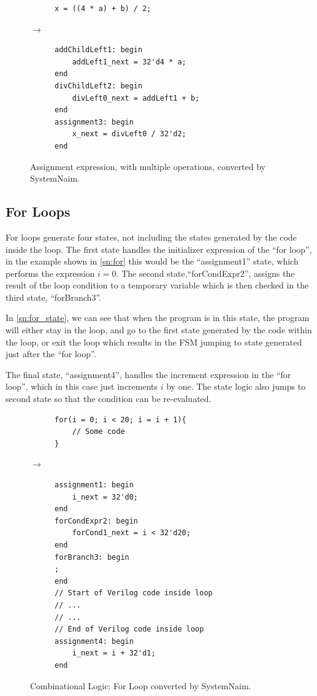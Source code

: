 \begin{figure}[H]
\centering
\begin{subfigure}{0.35\textwidth}
    \centering
    \begin{verbatim}
x = ((4 * a) + b) / 2;
    \end{verbatim}
\end{subfigure}%
{\LARGE$\rightarrow$}%
\begin{subfigure}{0.47\textwidth}
    \begin{verbatim}
addChildLeft1: begin
    addLeft1_next = 32'd4 * a;
end
divChildLeft2: begin
    divLeft0_next = addLeft1 + b;
end
assignment3: begin
    x_next = divLeft0 / 32'd2;
end
    \end{verbatim}
\end{subfigure}
\caption{Assignment expression, with multiple operations, converted by SystemNaim.}
\label{sn:expr_brackets}
\end{figure}


\subsection{For Loops}

For loops generate four states, not including the states generated by the code inside the loop. The first state handles the initializer expression of the “for loop”, in the example shown in \autoref{sn:for} this would be the “assignment1” state, which performs the expression $i = 0$. The second state,“forCondExpr2”, assigns the result of the loop condition to a temporary variable which is then checked in the third state, “forBranch3”.

In \autoref{sn:for_state}, we can see that when the program is in this state, the program will either stay in the loop, and go to the first state generated by the code within the loop, or exit the loop which results in the FSM jumping to state generated just after the “for loop”.

The final state, “assignment4”, handles the increment expression in the “for loop”, which in this case just increments $i$ by one. The state logic also jumps to second state so that the condition can be re-evaluated.

\begin{figure}[H]
\centering
\begin{subfigure}{0.42\textwidth}
    \centering
    \begin{verbatim}
for(i = 0; i < 20; i = i + 1){
    // Some code
}
    \end{verbatim}
\end{subfigure}%
{\LARGE$\rightarrow$}%
\begin{subfigure}{0.5\textwidth}
    \begin{verbatim}
assignment1: begin
    i_next = 32'd0;
end
forCondExpr2: begin
    forCond1_next = i < 32'd20;
end
forBranch3: begin
;
end
// Start of Verilog code inside loop
// ...
// ...
// End of Verilog code inside loop
assignment4: begin
    i_next = i + 32'd1;
end
    \end{verbatim}
\end{subfigure}
\caption{Combinational Logic: For Loop converted by SystemNaim.}
\label{sn:for}
\end{figure}

